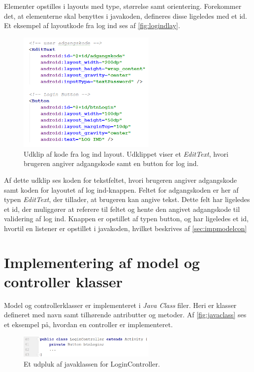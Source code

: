 Elementer opstilles i layouts med type, størrelse samt orientering. Forekommer det, at elementerne skal benyttes i javakoden, defineres disse ligeledes med et id. Et eksempel af layoutkode fra log ind ses af \autoref{fig:logindlay}.

\begin{figure} [H]
\centering
\includegraphics[width=0.6\textwidth]{figures/imple/logindlay}
\caption{Udklip af kode fra log ind layout. Udklippet viser et \textit{EditText}, hvori brugeren angiver adgangskode samt en button for log ind.}
\label{fig:logindlay}
\end{figure}

\noindent
Af dette udklip ses koden for tekstfeltet, hvori brugeren angiver adgangskode samt koden for layoutet af log ind-knappen. Feltet for adgangskoden er her af typen \textit{EditText}, der tillader, at brugeren kan angive tekst. Dette felt har ligeledes et id, der muliggører at referere til feltet og hente den angivet adgangskode til validering af log ind. Knappen er opstillet af typen button, og har ligeledes et id, hvortil en listener er opstillet i javakoden, hvilket beskrives af \autoref{sec:impmodelcon} 

\section{Implementering af model og controller klasser} \label{sec:impmodelcon}
Model og controllerklasser er implementeret i \textit{Java Class} filer. Heri er klasser defineret med navn samt tilhørende antributter og metoder. Af \autoref{fig:javaclass} ses et eksempel på, hvordan en controller er implementeret. 

\begin{figure} [H]
\centering
\includegraphics[width=0.6\textwidth]{figures/imple/javaclass}
\caption{Et udpluk af javaklassen for LoginController.}
\label{fig:javaclass}
\end{figure}

